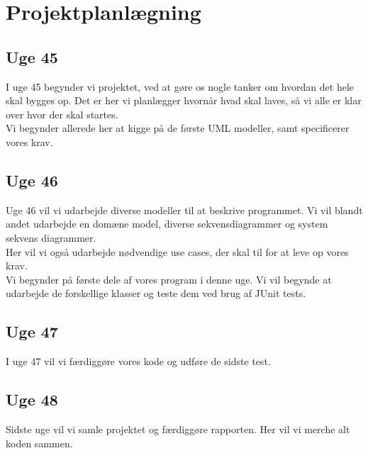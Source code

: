 \section{Projektplanlægning}
\subsection{Uge 45}
I uge 45 begynder vi projektet, ved at gøre os nogle tanker om hvordan det hele skal bygges op. Det er her vi planlægger hvornår hvad skal laves, så vi alle er klar over hvor der skal startes.\\
Vi begynder allerede her at kigge på de første UML modeller, samt specificerer vores krav.

\subsection{Uge 46}
Uge 46 vil vi udarbejde diverse modeller til at beskrive programmet. Vi vil blandt andet udarbejde en domæne model, diverse sekvensdiagrammer og system sekvens diagrammer. \\
Her vil vi også udarbejde nødvendige use cases, der skal til for at leve op vores krav.\\
Vi begynder på første dele af vores program i denne uge. Vi vil begynde at udarbejde de forskellige klasser og teste dem ved brug af JUnit tests.

\subsection{Uge 47}
I uge 47 vil vi færdiggøre vores kode og udføre de sidste test. 

\subsection{Uge 48}
Sidste uge vil vi samle projektet og færdiggøre rapporten. Her vil vi merche alt koden sammen. 

